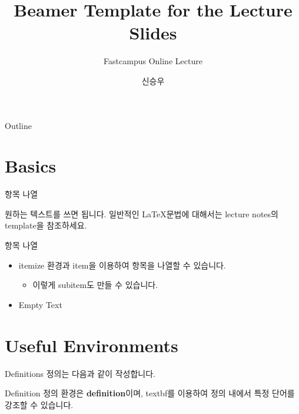 \documentclass{beamer}
\title{Beamer Template for the Lecture Slides}
\subtitle{Fastcampus Online Lecture}
\author{신승우}
\newenvironment{slide}[1][]
{%
  \begin{frame}[allowframebreaks,#1]%
  }{%
  \end{frame}%
}
\begin{document}
\begin{slide}
  \titlepage
\end{slide}

\begin{slide}{Outline}
  \tableofcontents %
\end{slide}


\section{Basics} 


\begin{slide}[fragile, environment=slide]{항목 나열} 

원하는 텍스트를 쓰면 됩니다. 일반적인 \LaTeX 문법에 대해서는 lecture notes의 template을 참조하세요.

\end{slide}

\begin{slide}[fragile, environment=slide]{항목 나열} 

\begin{itemize} 
\item itemize 환경과 item을 이용하여 항목을 나열할 수 있습니다. 
\begin{itemize} 
\item 이렇게 subitem도 만들 수 있습니다. 
\end{itemize}
\item Empty Text 
\end{itemize}
\end{slide}


\section{Useful Environments}

\begin{slide}[fragile, environment=slide]{Definitions} 
정의는 다음과 같이 작성합니다. 

\begin{definition}{Definition} 
정의 환경은 \textbf{definition}이며, textbf를 이용하여 정의 내에서 특정 단어를 강조할 수 있습니다. 
\end{definition}

\end{slide}
\end{document}
